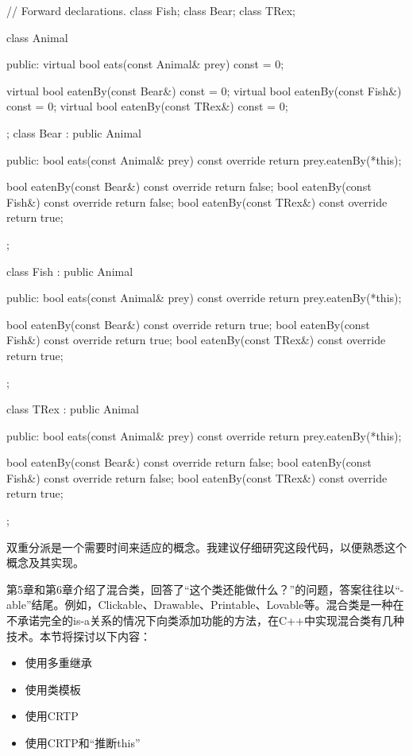 \begin{cpp}
// Forward declarations.
class Fish;
class Bear;
class TRex;

class Animal
{
    public:
        virtual bool eats(const Animal& prey) const = 0;

        virtual bool eatenBy(const Bear&) const = 0;
        virtual bool eatenBy(const Fish&) const = 0;
        virtual bool eatenBy(const TRex&) const = 0;
};
class Bear : public Animal
{
    public:
        bool eats(const Animal& prey) const override{ return prey.eatenBy(*this); }

        bool eatenBy(const Bear&) const override { return false; }
        bool eatenBy(const Fish&) const override { return false; }
        bool eatenBy(const TRex&) const override { return true; }
};

class Fish : public Animal
{
    public:
        bool eats(const Animal& prey) const override{ return prey.eatenBy(*this); }

        bool eatenBy(const Bear&) const override { return true; }
        bool eatenBy(const Fish&) const override { return true; }
        bool eatenBy(const TRex&) const override { return true; }
};

class TRex : public Animal
{
    public:
        bool eats(const Animal& prey) const override{ return prey.eatenBy(*this); }

        bool eatenBy(const Bear&) const override { return false; }
        bool eatenBy(const Fish&) const override { return false; }
        bool eatenBy(const TRex&) const override { return true; }
};
\end{cpp}

双重分派是一个需要时间来适应的概念。我建议仔细研究这段代码，以便熟悉这个概念及其实现。


第5章和第6章介绍了混合类，回答了“这个类还能做什么？”的问题，答案往往以“-able”结尾。例如，Clickable、Drawable、Printable、Lovable等。混合类是一种在不承诺完全的is-a关系的情况下向类添加功能的方法，在C++中实现混合类有几种技术。本节将探讨以下内容：

\begin{itemize}
\item
使用多重继承

\item
使用类模板

\item
使用CRTP

\item
使用CRTP和“推断this”
\end{itemize}


